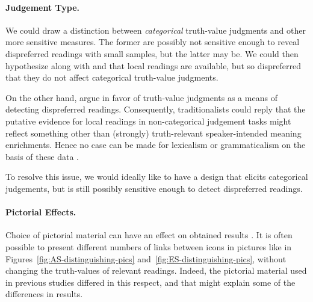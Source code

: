 \documentclass[fleqn,reqno,10pt,draft]{article}
\begin{document}
\paragraph{Judgement Type.} We could draw a distinction between
\emph{categorical} truth-value judgments and other more sensitive
measures. The former are possibly not sensitive enough to reveal
dispreferred readings with small samples, but the latter may be. We
could then hypothesize along with
\citeauthor{CliftonDube2010:Embedded-Implic} and
\citeauthor{ChemlaSpector2010:Experimental-Ev} that local readings are
available, but so dispreferred that they do not affect categorical
truth-value judgments. 

On the other hand, \citet{Crain1998} argue in favor of truth-value
judgments as a means of detecting dispreferred readings. Consequently,
traditionalists could reply that the putative evidence for local
readings in non-categorical judgement tasks might reflect something
other than (strongly) truth-relevant speaker-intended meaning
enrichments. Hence no case can be made for lexicalism or
grammaticalism on the basis of these data \citep[see][for arguments
along these
lines]{GeurtsTielvan-Tiel2013:Scalar-expressi,Tielvan-Tiel2014:Quantity-Matter,Tielvan-Tiel2012:Embedded-Scalar}.

To resolve this issue, we would ideally like to have a design that
elicits categorical judgements, but is still possibly sensitive enough
to detect dispreferred readings. 

\paragraph{Pictorial Effects.} Choice of pictorial material can have
an effect on obtained results \citep[see][for related
discussion]{Raffray2010}. It is often possible to present different
numbers of links between icons in pictures like in
Figures~\ref{fig:AS-distinguishing-pics}
and~\ref{fig:ES-distinguishing-pics}, without changing the
truth-values of relevant readings. Indeed, the pictorial material used
in previous studies differed in this respect, and that might explain
some of the differences in results.
\end{document}
